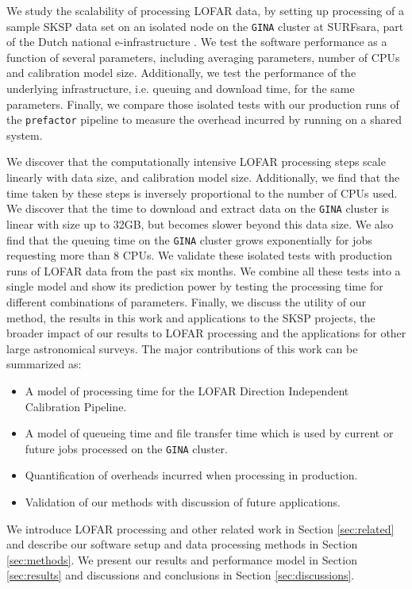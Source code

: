 We study the scalability of processing LOFAR data, by setting up processing of a sample SKSP data set on an isolated node on the \texttt{GINA} cluster at SURFsara, part of the Dutch national e-infrastructure \citep{dutch_einfra}. We test the software performance as a function of several parameters, including averaging parameters, number of CPUs and calibration model size. Additionally, we test the performance of the underlying infrastructure, i.e. queuing  and download time, for the same parameters. Finally, we compare those isolated tests with our production runs of the \texttt{prefactor} pipeline to measure the overhead incurred by running on a shared system. 

We discover that the computationally intensive LOFAR processing steps scale linearly with data size, and calibration model size. Additionally, we find that the time taken by these steps is inversely proportional to the number of CPUs used. We discover that the time to download and extract data on the \texttt{GINA} cluster is linear with size up to 32GB, but becomes slower beyond this data size. We also find that the queuing time on the \texttt{GINA} cluster grows exponentially for jobs requesting more than 8 CPUs. We validate these isolated tests with production runs of LOFAR data from the past six months. We combine all these tests into a single model and show its prediction power by testing the processing time for different combinations of parameters. Finally, we discuss the utility of our method, the results in this work and applications to the SKSP projects, the broader impact of our results to LOFAR processing and the applications for other large astronomical surveys. The major contributions of this work can be summarized as:

\begin{itemize}
    \item A model of processing time for the  LOFAR Direction Independent Calibration Pipeline.
    \item A model of queueing time and file transfer time which is used by current or future jobs processed on the \texttt{GINA} cluster.
    \item Quantification of overheads incurred when processing in production. 
    \item Validation of our methods with discussion of future applications. 
\end{itemize}

We introduce LOFAR processing and other related work in Section \ref{sec:related} and describe our software setup and data processing methods in Section \ref{sec:methods}. We present our results and performance model in Section \ref{sec:results} and discussions and conclusions in Section \ref{sec:discussions}. 

